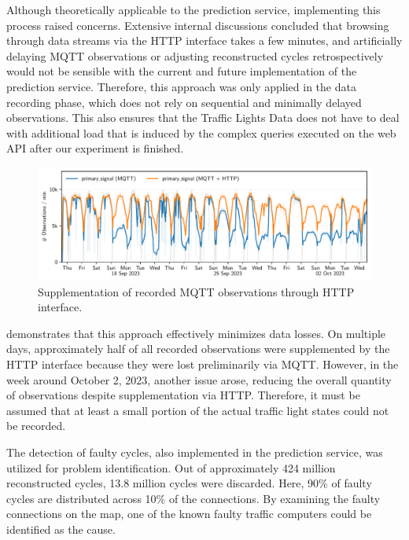 Although theoretically applicable to the prediction service, implementing this process raised concerns. Extensive internal discussions concluded that browsing through data streams via the HTTP interface takes a few minutes, and artificially delaying MQTT observations or adjusting reconstructed cycles retrospectively would not be sensible with the current and future implementation of the prediction service. Therefore, this approach was only applied in the data recording phase, which does not rely on sequential and minimally delayed observations. This also ensures that the Traffic Lights Data does not have to deal with additional load that is induced by the complex queries executed on the web API after our experiment is finished.

\begin{figure}[t]
    \centering
    \includegraphics[width=\linewidth]{images/adaptiveness-mqtt-http.pdf}
    \caption{Supplementation of recorded MQTT observations through HTTP interface.}\label{fig:adaptiveness-mqtt-http}
\end{figure}

 demonstrates that this approach effectively minimizes data losses. On multiple days, approximately half of all recorded observations were supplemented by the HTTP interface because they were lost preliminarily via MQTT. However, in the week around October 2, 2023, another issue arose, reducing the overall quantity of observations despite supplementation via HTTP. Therefore, it must be assumed that at least a small portion of the actual traffic light states could not be recorded.

The detection of faulty cycles, also implemented in the prediction service, was utilized for problem identification. Out of approximately 424 million reconstructed cycles, 13.8 million cycles were discarded. Here, 90\% of faulty cycles are distributed across 10\% of the connections. By examining the faulty connections on the map, one of the known faulty traffic computers could be identified as the cause.


